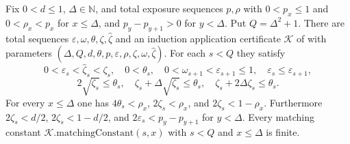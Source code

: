 \begin{lemma}
Fix $0<d\leq1$, $\Delta\in\mathbb N$, and total exposure sequences
$p,\rho$ with $0<p_x\leq1$ and $0<\rho_x<p_x$ for $x\leq\Delta$,
and $p_y-p_{y+1}>0$ for $y<\Delta$. Put $Q=\Delta^2+1$.
There are total sequences $\varepsilon,\omega,\theta,\zeta,\widehat\zeta$
and an induction application certificate $\mathcal K$ of
 with parameters
$(\Delta,Q,d,\theta,p,\varepsilon,\rho,\zeta,\omega,\widehat\zeta)$.
For each $s<Q$ they satisfy
\[
 0<\varepsilon_s<\widehat\zeta_s<\zeta_s,\quad0<\theta_s,
 \quad0<\omega_{s+1}<\varepsilon_{s+1}\leq1,
 \quad\varepsilon_s\leq\varepsilon_{s+1},
\]
\[
 2\sqrt{\zeta_s}\leq\theta_s,\quad
 \zeta_s+\Delta\sqrt{\zeta_s}\leq\theta_s,\quad
 \zeta_s+2\Delta\zeta_s\leq\theta_s.
\]
For every $x\leq\Delta$ one has
$4\theta_s<\rho_x$, $2\zeta_s<\rho_x$, and
$2\zeta_s<1-\rho_x$. Furthermore $2\zeta_s<d/2$,
$2\zeta_s<1-d/2$, and $2\varepsilon_s<p_y-p_{y+1}$ for $y<\Delta$.
Every matching constant $\mathcal K.\mathrm{matchingConstant}(s,x)$
with $s<Q$ and $x\leq\Delta$ is finite.
\end{lemma}
